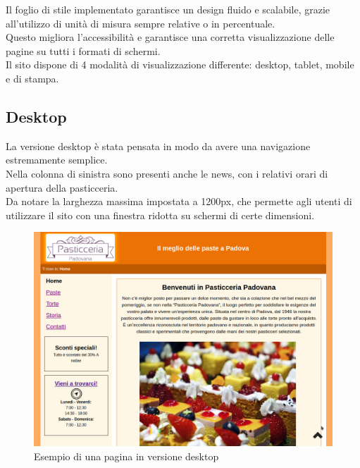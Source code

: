 Il foglio di stile implementato garantisce un design fluido e scalabile, grazie all'utilizzo di unità di misura
sempre relative o in percentuale. \\Questo migliora l'accessibilità e garantisce una corretta visualizzazione delle pagine
su tutti i formati di schermi. \\Il sito dispone di 4 modalità di visualizzazione differente: desktop, tablet, mobile e di stampa.

\subsection{Desktop}
La versione desktop è stata pensata in modo da avere una navigazione estremamente semplice.\\ 
Nella colonna di sinistra sono presenti anche le news, con i relativi orari di apertura della pasticceria.\\ 
Da notare la larghezza massima impostata a 1200px, che permette agli utenti di utilizzare il sito con una finestra ridotta su schermi di certe dimensioni.

\begin{figure}[!h]
	\centering
	\includegraphics[width=1\linewidth]{sezioni/Progettazione/Immagini/desktop_example.png}
	\caption{Esempio di una pagina in versione desktop}
	\label{Fig:verDesktop}
\end{figure}

